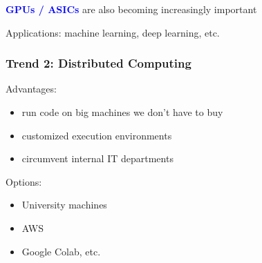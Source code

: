 \documentclass[
    xcolor={svgnames},
    hyperref={colorlinks, citecolor=DeepPink4, linkcolor=DarkRed, urlcolor=DarkBlue}
    ]{beamer}  %
\newcommand{\navy}[1]{\textcolor{Blue}{\bf #1}}
\newcommand{\1}{\mathbbm 1}
\begin{document}
\begin{frame}

    \navy{GPUs / ASICs} are also becoming increasingly important


    \begin{figure}
       \begin{center}
       \end{center}
    \end{figure}

    \vspace{0.5em}

    Applications: machine learning, deep learning, etc.
    

\end{frame}


\begin{frame}
    \frametitle{Trend 2: Distributed Computing}
    
    Advantages: 
    \begin{itemize}
        \item run code on big machines we don't have to buy
        \vspace{0.5em}
        \item customized execution environments
        \vspace{0.5em}
        \item circumvent internal IT departments
    \end{itemize}

    \vspace{0.5em}

    Options:
    \begin{itemize}
        \item University machines
            \vspace{0.5em}
        \item AWS 
            \vspace{0.5em}
        \item Google Colab, etc.
    \end{itemize}

\end{frame}
\end{document}
